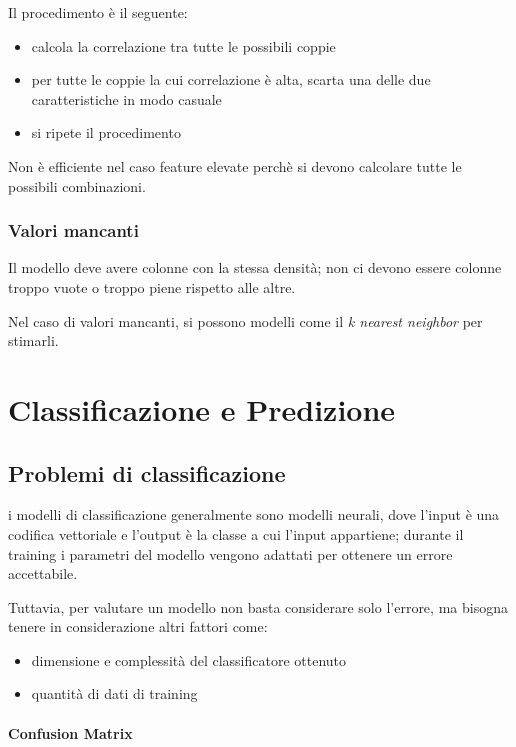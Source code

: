 \documentclass{report}
\begin{document}
\noindent Il procedimento è il seguente:
\begin{itemize}
    \item calcola la correlazione tra tutte le possibili coppie 
    \item per tutte le coppie la cui correlazione è alta, scarta una delle due caratteristiche in modo casuale 
    \item si ripete il procedimento 
\end{itemize}

\noindent Non è efficiente nel caso feature elevate perchè si devono calcolare tutte le possibili combinazioni.

\subsection{Valori mancanti}

Il modello deve avere colonne con la stessa densità; non ci devono essere colonne troppo vuote o troppo piene rispetto alle altre.

\noindent Nel caso di valori mancanti, si possono modelli come il \textit{k nearest neighbor} per stimarli.




\chapter{Classificazione e Predizione}

\section{Problemi di classificazione}

i modelli di classificazione generalmente sono modelli neurali, dove l'input è una codifica vettoriale e l'output è la classe 
a cui l'input appartiene; durante il training i parametri del modello vengono adattati per ottenere un errore accettabile.

\noindent Tuttavia, per valutare un modello non basta considerare solo l'errore, ma bisogna tenere in considerazione altri fattori come:
\begin{itemize}
    \item dimensione e complessità del classificatore ottenuto 
    \item quantità di dati di training 
\end{itemize}

\subsubsection{Confusion Matrix}
\end{document}
